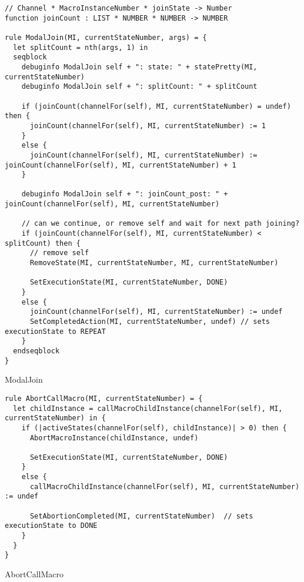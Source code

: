\begin{listing}[H]
\begin{verbatim}
// Channel * MacroInstanceNumber * joinState -> Number
function joinCount : LIST * NUMBER * NUMBER -> NUMBER

rule ModalJoin(MI, currentStateNumber, args) = {
  let splitCount = nth(args, 1) in
  seqblock
    debuginfo ModalJoin self + ": state: " + statePretty(MI, currentStateNumber)
    debuginfo ModalJoin self + ": splitCount: " + splitCount

    if (joinCount(channelFor(self), MI, currentStateNumber) = undef) then {
      joinCount(channelFor(self), MI, currentStateNumber) := 1
    }
    else {
      joinCount(channelFor(self), MI, currentStateNumber) := joinCount(channelFor(self), MI, currentStateNumber) + 1
    }

    debuginfo ModalJoin self + ": joinCount_post: " + joinCount(channelFor(self), MI, currentStateNumber)

    // can we continue, or remove self and wait for next path joining?
    if (joinCount(channelFor(self), MI, currentStateNumber) < splitCount) then {
      // remove self
      RemoveState(MI, currentStateNumber, MI, currentStateNumber)

      SetExecutionState(MI, currentStateNumber, DONE)
    }
    else {
      joinCount(channelFor(self), MI, currentStateNumber) := undef
      SetCompletedAction(MI, currentStateNumber, undef) // sets executionState to REPEAT
    }
  endseqblock
}
\end{verbatim}
\caption{ModalJoin}
\label{lst:asm:ModalJoin}
\end{listing}




\begin{listing}[H]
\begin{verbatim}
rule AbortCallMacro(MI, currentStateNumber) = {
  let childInstance = callMacroChildInstance(channelFor(self), MI, currentStateNumber) in {
    if (|activeStates(channelFor(self), childInstance)| > 0) then {
      AbortMacroInstance(childInstance, undef)

      SetExecutionState(MI, currentStateNumber, DONE)
    }
    else {
      callMacroChildInstance(channelFor(self), MI, currentStateNumber) := undef

      SetAbortionCompleted(MI, currentStateNumber)  // sets executionState to DONE
    }
  }
}
\end{verbatim}
\caption{AbortCallMacro}
\label{lst:asm:AbortCallMacro}
\end{listing}




